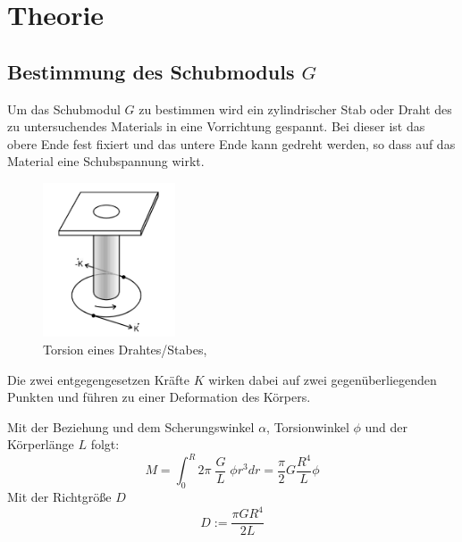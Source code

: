 \newpage
\section{Theorie}
\label{sec:theorie}

\subsection{Bestimmung des Schubmoduls $G$}
Um das Schubmodul $G$ zu bestimmen wird ein zylindrischer Stab oder Draht des zu untersuchendes
Materials in eine Vorrichtung gespannt. Bei dieser ist das obere Ende fest fixiert und das untere
Ende kann gedreht werden, so dass auf das Material eine Schubspannung wirkt.

\begin{figure}[h]
    \centering
    \includegraphics[width=0.35\textwidth, height=0.4\textwidth]{bilder/Torsion_allgemein.jpeg}
    \caption{Torsion eines Drahtes/Stabes,\cite[5]{Anleitung}}        
    \label{fig:torsion_allgemein}
\end{figure} 

Die zwei entgegengesetzen Kräfte $K$ wirken dabei auf zwei gegenüberliegenden Punkten 
und führen zu einer Deformation des Körpers.

Mit der Beziehung  %
und dem Scherungswinkel $\alpha$, Torsionwinkel $\phi$ 
und der Körperlänge $L$ folgt:
\begin{equation}
    M = \int_{0}^{R} 2\pi\;\frac{G}{L}\;\phi r^3 dr = \frac{\pi}{2}G\frac{R^4}{L}\phi
\end{equation}
Mit der Richtgröße $D$
\begin{equation}
    D:=\frac{\pi G R^4}{2L}
    \label{eqn:richtgroesse}
\end{equation}

